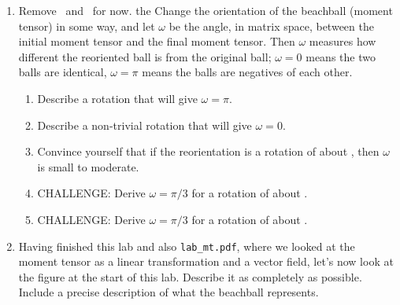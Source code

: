 \documentclass[11pt,titlepage,fleqn]{article}
\newcommand{\fvect}{\textcolor{red}{\mbT}}
\newcommand{\fvecb}{\textcolor{blue}{\mbB}}
\newcommand{\fvecp}{\textcolor{black}{\mbP}}
\newcommand{\fvecn}{\mbN}
\newcommand{\fvecs}{\mbS}
\begin{document}
\begin{enumerate}
\begin{enumerate}
\end{enumerate}


\item Remove \fvecn\ and \fvecs\ for now. the Change the orientation of the beachball (moment tensor) in some way, and let $\omega$ be the angle, in matrix space, between the initial moment tensor and the final moment tensor. Then $\omega$ measures how different the reoriented ball is from the original ball; $\omega=0$ means the two balls are identical, $\omega=\pi$ means the balls are negatives of each other.

\begin{enumerate}
\item Describe a rotation that will give $\omega=\pi$.

\item Describe a non-trivial rotation that will give $\omega=0$.

\item Convince yourself that if the reorientation is a rotation of  about \fvecp, then $\omega$ is small to moderate.

\item CHALLENGE: Derive $\omega=\pi/3$ for a rotation of  about \fvecp.

\item CHALLENGE: Derive $\omega=\pi/3$ for a rotation of  about \fvect.

\end{enumerate}






\item Having finished this lab and also \verb+lab_mt.pdf+, where we looked at the moment tensor as a linear transformation and a vector field, let's now look at the figure at the start of this lab. Describe it as completely as possible. Include a precise description of what the beachball represents.

\end{enumerate}
\end{document}
